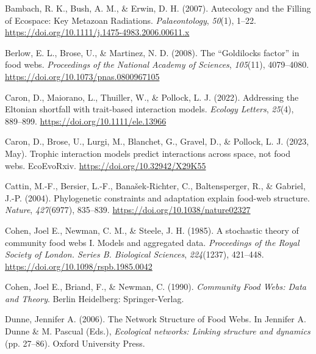 \documentclass[
]{agujournal2019}
\newlength{\cslhangindent}
\newenvironment{CSLReferences}[2] %
 {\begin{list}{}{%
  \setlength{\itemindent}{0pt}
  \setlength{\leftmargin}{0pt}
  \setlength{\parsep}{0pt}
  \ifodd #1
   \setlength{\leftmargin}{\cslhangindent}
   \setlength{\itemindent}{-1\cslhangindent}
  \fi
  \setlength{\itemsep}{#2\baselineskip}}}
 {\end{list}}
\begin{document}
\label{refs}
\begin{CSLReferences}{1}{0}
Bambach, R. K., Bush, A. M., \& Erwin, D. H. (2007). Autecology and the
{Filling} of {Ecospace}: {Key Metazoan Radiations}.
\emph{Palaeontology}, \emph{50}(1), 1--22.
\url{https://doi.org/10.1111/j.1475-4983.2006.00611.x}

Berlow, E. L., Brose, U., \& Martinez, N. D. (2008). The {``{Goldilocks}
factor''} in food webs. \emph{Proceedings of the National Academy of
Sciences}, \emph{105}(11), 4079--4080.
\url{https://doi.org/10.1073/pnas.0800967105}

Caron, D., Maiorano, L., Thuiller, W., \& Pollock, L. J. (2022).
Addressing the {Eltonian} shortfall with trait-based interaction models.
\emph{Ecology Letters}, \emph{25}(4), 889--899.
\url{https://doi.org/10.1111/ele.13966}

Caron, D., Brose, U., Lurgi, M., Blanchet, G., Gravel, D., \& Pollock,
L. J. (2023, May). Trophic interaction models predict interactions
across space, not food webs. {EcoEvoRxiv}.
\url{https://doi.org/10.32942/X29K55}

Cattin, M.-F., Bersier, L.-F., Banašek-Richter, C., Baltensperger, R.,
\& Gabriel, J.-P. (2004). Phylogenetic constraints and adaptation
explain food-web structure. \emph{Nature}, \emph{427}(6977), 835--839.
\url{https://doi.org/10.1038/nature02327}

Cohen, Joel E., Newman, C. M., \& Steele, J. H. (1985). A stochastic
theory of community food webs {I}. {Models} and aggregated data.
\emph{Proceedings of the Royal Society of London. Series B. Biological
Sciences}, \emph{224}(1237), 421--448.
\url{https://doi.org/10.1098/rspb.1985.0042}

Cohen, Joel E., Briand, F., \& Newman, C. (1990). \emph{Community {Food
Webs}: {Data} and {Theory}}. {Berlin Heidelberg}: {Springer-Verlag}.

Dunne, Jennifer A. (2006). The {Network Structure} of {Food Webs}. In
Jennifer A. Dunne \& M. Pascual (Eds.), \emph{Ecological networks:
{Linking} structure and dynamics} (pp. 27--86). {Oxford University
Press}.


\end{CSLReferences}
\end{document}
